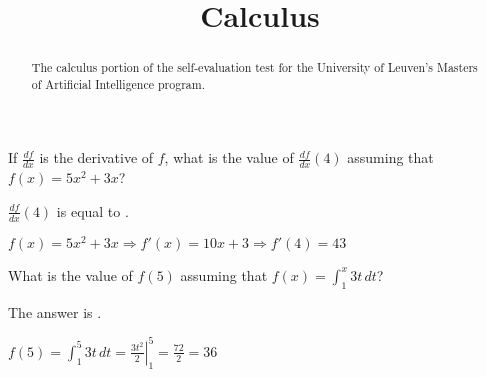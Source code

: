 \documentclass{ximera}
\title{Calculus}
\begin{document}
\begin{abstract}
The calculus portion of the self-evaluation test for the University of
Leuven's Masters of Artificial Intelligence program.
\end{abstract}
\maketitle

\begin{question}
If $\frac{df}{dx}$ is the derivative of $f$, what is the value of
$\frac{df}{dx}(4)$ assuming that $f(x) = 5x^2 +3x$?

\begin{solution}
$\frac{df}{dx}(4)$ is equal to .
\end{solution}
$f(x) = 5x^2 + 3x \Rightarrow f'(x) = 10 x + 3 \Rightarrow f'(4) = 43$
\end{question}

\begin{question}
What is the value of $f(5) $ assuming that $f(x) = \int_1^x 3t \,dt$?
\begin{solution}
The answer is .
\end{solution}
$f(5) = \int_1^5 3t \,dt = \left. \frac{3t^2}{2} \right|_1^5 =
\frac{72}{2} = 36$
\end{question}
\end{document}
